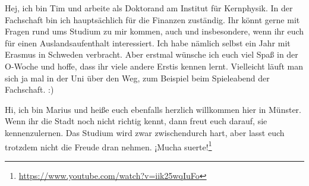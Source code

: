 \begin{multicols}{2}
\vspace{-0.5cm}

{
Hej, ich bin Tim und arbeite als Doktorand am Institut für Kernphysik. In der Fachschaft bin ich hauptsächlich für die Finanzen zuständig. Ihr könnt gerne mit Fragen rund ums Studium zu mir kommen, auch und insbesondere, wenn ihr euch für einen Auslandsaufenthalt interessiert. Ich habe nämlich selbst ein Jahr mit Erasmus in Schweden verbracht. Aber erstmal wünsche ich euch viel Spaß in der O-Woche und hoffe, dass ihr viele andere Erstis kennen lernt. Vielleicht läuft man sich ja mal in der Uni über den Weg, zum Beispiel beim Spieleabend der Fachschaft. :) 
}

{
Hi, ich bin Marius und heiße euch ebenfalls herzlich willkommen hier in Münster. Wenn ihr die Stadt noch nicht richtig kennt, dann freut euch darauf, sie kennenzulernen. 
Das Studium wird zwar zwischendurch hart, aber lasst euch trotzdem nicht die Freude dran nehmen. ¡Mucha suerte!\footnote{\url{https://www.youtube.com/watch?v=iik25wqIuFo}}
}


\vspace{-0.4cm}



\end{multicols}
